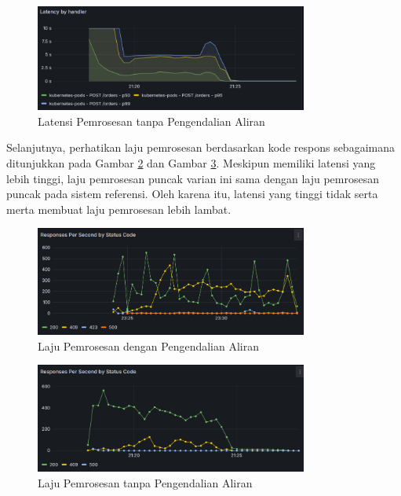 \begin{figure}[htbp]
    \centering
    \includegraphics[width=0.8\textwidth]{resources/chapter-4/latency-nofc-pg-stress-0.png}
    \caption{Latensi Pemrosesan tanpa Pengendalian Aliran}
    \label{fig:latency-nofc}
\end{figure}

Selanjutnya, perhatikan laju pemrosesan berdasarkan kode respons sebagaimana ditunjukkan pada Gambar \ref{fig:rps-fc-pg-stress-0} dan Gambar \ref{fig:rps-nofc-pg-stress-0}. Meskipun memiliki latensi yang lebih tinggi, laju pemrosesan puncak varian ini sama dengan laju pemrosesan puncak pada sistem referensi. Oleh karena itu, latensi yang tinggi tidak serta merta membuat laju pemrosesan lebih lambat.

\pagebreak

\begin{figure}[htbp]
    \centering
    \includegraphics[width=0.8\textwidth]{resources/chapter-4/rps-fc-pg-stress-0.png}
    \caption{Laju Pemrosesan dengan Pengendalian Aliran}
    \label{fig:rps-fc-pg-stress-0}
\end{figure}

\begin{figure}[htbp]
    \centering
    \includegraphics[width=0.8\textwidth]{resources/chapter-4/rps-nofc-pg-stress-0.png}
    \caption{Laju Pemrosesan tanpa Pengendalian Aliran}
    \label{fig:rps-nofc-pg-stress-0}
\end{figure}

